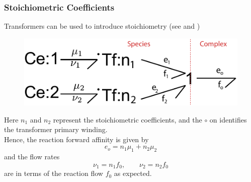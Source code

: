 \documentclass[10pt,reqno]{beamer}
\begin{document}
\begin{frame}
\frametitle{Stoichiometric Coefficients}
Transformers can be used to introduce stoichiometry (see \cite{Oster:1973aa} and \cite{Gawthrop:2014aa})
\begin{figure}
	\includegraphics[scale=0.5]{images/stoic_oster}
\end{figure}
Here $n_1$ and $n_2$ represent the stoichiometric coefficients, and the $\circ$ on identifies the transformer primary winding.\\
Hence, the reaction forward affinity is given by
\[
e_o = n_1\mu_1 + n_2 \mu_2
\]
and the flow rates 
\[
\nu_1 = n_1f_0,\qquad \nu_2 = n_2f_0
\]
are in terms of the reaction flow $f_0$ as expected.
\end{frame}
\end{document}
